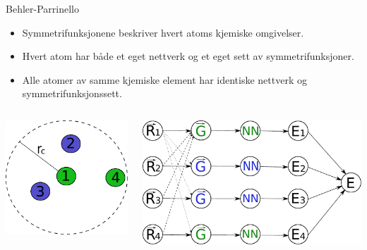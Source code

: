\documentclass{beamer}
\begin{document}
\begin{frame}{Behler-Parrinello}

\begin{itemize}
 \item Symmetrifunksjonene beskriver hvert atoms kjemiske omgivelser. 
 \item Hvert atom har både et eget nettverk og et eget sett av symmetrifunksjoner.  
 \item Alle atomer av samme kjemiske element har identiske nettverk og symmetrifunksjonssett. 
\end{itemize}

\begin{columns}[c] %
  \begin{column}[c]{0.35\linewidth} %
   \centering
   \includegraphics[width=\linewidth]{../Figures/Presentation/cutoffSphere.pdf}
  \end{column}
  \begin{column}[c]{0.65\linewidth} %
   \includegraphics[width=\linewidth]{../Figures/Presentation/BehlerParrinello.pdf}
  \end{column}
\end{columns}

\end{frame}
\end{document}
